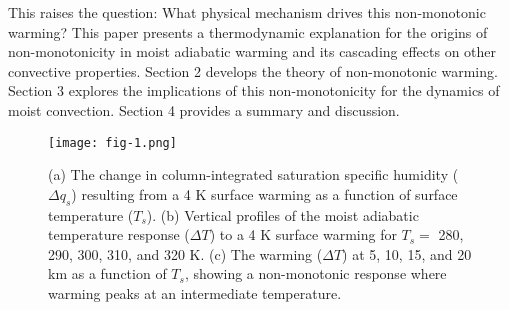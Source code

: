 \documentclass{ametsocV6.1}
\begin{document}
This raises the question: What physical mechanism drives this non-monotonic warming? This paper presents a thermodynamic explanation for the origins of non-monotonicity in moist adiabatic warming and its cascading effects on other convective properties. Section 2 develops the theory of non-monotonic warming. Section 3 explores the implications of this non-monotonicity for the dynamics of moist convection. Section 4 provides a summary and discussion.

\begin{figure}[htbp]
 \centering
 \texttt{[image: fig-1.png]}\\
 \caption{(a) The change in column-integrated saturation specific humidity ($\Delta q_s$) resulting from a 4 K surface warming as a function of surface temperature ($T_s$). (b) Vertical profiles of the moist adiabatic temperature response ($\Delta T$) to a 4 K surface warming for $T_s = $ 280, 290, 300, 310, and 320 K. (c) The warming ($\Delta T$) at 5, 10, 15, and 20 km as a function of $T_s$, showing a non-monotonic response where warming peaks at an intermediate temperature.}\label{fig:fig-1}
\end{figure}
\end{document}
